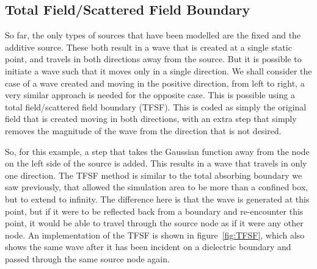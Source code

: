\subsection{Total Field/Scattered Field Boundary} %
\label{sub:total_field_scattered_field_boundary}
So far, the only types of sources that have been modelled are the fixed and the additive source. These both result in a wave that is created at a single static point, and travels in both directions away from the source. But it is possible to initiate a wave such that it moves only in a single direction. We shall consider the case of a wave created and moving in the positive direction, from left to right, a very similar approach is needed for the opposite case. This is possible using a total field/scattered field boundary (TFSF). This is coded as simply the original field that is created moving in both directions, with an extra step that simply removes the magnitude of the wave from the direction that is not desired. 

So, for this example, a step that takes the Gaussian function away from the node on the left side of the source is added. This results in a wave that travels in only one direction. The TFSF method is similar to the total absorbing boundary we saw previously, that allowed the simulation area to be more than a confined box, but to extend to infinity. The difference here is that the wave is generated at this point, but if it were to be reflected back from a boundary and re-encounter this point, it would be able to travel through the source node as if it were any other node. An implementation  of the TFSF is shown in figure~\ref{fig:TFSF}, which also shows the same wave after it has been incident on a dielectric boundary and passed through the same source node again.

